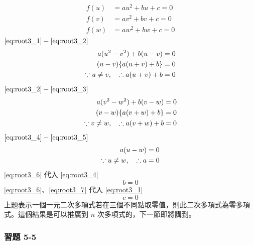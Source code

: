 \begin{solution*}
\begin{align}
  f(u) &= au^2+bu+c = 0 \label{eq:root3_1} \\
  f(v) &= av^2+bv+c = 0 \label{eq:root3_2} \\
  f(w) &= aw^2+bw+c = 0 \label{eq:root3_3}
\end{align}
$\eqref{eq:root3_1}-\eqref{eq:root3_2}$
\begin{align}
  a(u^2-v^2)+b(u-v) &= 0 \notag \\
  (u-v)\{a(u+v)+b\} &= 0 \notag \\
  \because u \neq v, \quad \therefore a(u+v)+b &= 0 \label{eq:root3_4}
\end{align}
$\eqref{eq:root3_2}-\eqref{eq:root3_3}$
\begin{align}
  a(v^2-w^2)+b(v-w) &= 0 \notag \\
  (v-w)\{a(v+w)+b\} &= 0 \notag \\
  \because v \neq w, \quad \therefore a(v+w)+b &= 0 \label{eq:root3_5}
\end{align}
$\eqref{eq:root3_4}-\eqref{eq:root3_5}$
\begin{align}
  a(u-w) &= 0 \notag \\
  \because u \neq w, \quad \therefore a &= 0 \label{eq:root3_6}
\end{align}
\eqref{eq:root3_6} 代入 \eqref{eq:root3_4}
\begin{equation}\label{eq:root3_7}
  b = 0
\end{equation}
\eqref{eq:root3_6}、\eqref{eq:root3_7} 代入 \eqref{eq:root3_1}
\begin{equation}\label{eq:root3_8}
  c = 0
\end{equation}
上題表示一個一元二次多項式若在三個不同點取零值，則此二次多項式為零多項式。這個結果是可以推廣到 $n$ 次多項式的，下一節即將講到。
\end{solution*}

\subsubsection*{習題 5-5}\label{sec:ex5-5}

